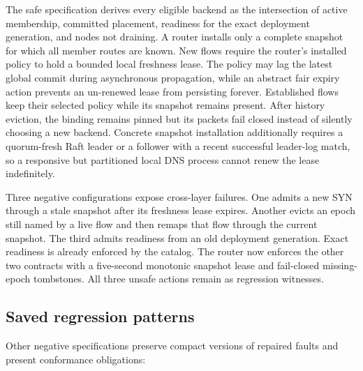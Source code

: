 The safe specification derives every eligible backend as the intersection of
active membership, committed placement, readiness for the exact deployment
generation, and nodes not draining. A router installs only a complete snapshot
for which all member routes are known. New flows require the router's installed
policy to hold a bounded local freshness lease. The policy may lag the latest
global commit during asynchronous propagation, while an abstract fair expiry action
prevents an un-renewed lease from persisting forever. Established flows keep
their selected policy while its snapshot remains present. After history
eviction, the binding remains pinned but its packets fail closed instead of
silently choosing a new backend. Concrete snapshot installation additionally
requires a quorum-fresh Raft leader or a follower with a recent successful
leader-log match, so a responsive but partitioned local DNS process cannot
renew the lease indefinitely.

Three negative configurations expose cross-layer failures. One
admits a new SYN through a stale snapshot after its freshness lease expires.
Another evicts an epoch still named by a live flow and then remaps that
flow through the current snapshot. The third admits readiness from an old
deployment generation. Exact readiness is already enforced by the catalog.
The router now enforces the other two contracts with a five-second monotonic
snapshot lease and fail-closed missing-epoch tombstones. All three unsafe
actions remain as regression witnesses.

\subsection{Saved regression patterns}

Other negative specifications preserve compact versions of repaired faults and
present conformance obligations:

